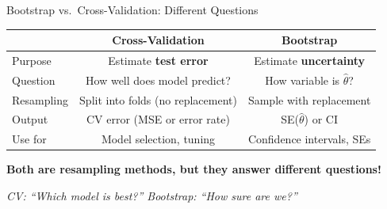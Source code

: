 \documentclass[aspectratio=169, 11pt]{beamer}
\begin{document}
\begin{frame}{Bootstrap vs.\ Cross-Validation: Different Questions}

\begin{center}
\begin{tabular}{lcc}
\toprule
 & Cross-Validation & Bootstrap \\
\midrule
Purpose & Estimate \textbf{test error} & Estimate \textbf{uncertainty} \\
Question & How well does model predict? & How variable is $\hat{\theta}$? \\
Resampling & Split into folds (no replacement) & Sample with replacement \\
Output & CV error (MSE or error rate) & SE($\hat{\theta}$) or CI \\
Use for & Model selection, tuning & Confidence intervals, SEs \\
\bottomrule
\end{tabular}
\end{center}

\vspace{0.5em}
\textbf{Both are resampling methods, but they answer different questions!}

\vspace{0.3em}
\textit{CV: ``Which model is best?'' \quad Bootstrap: ``How sure are we?''}
\end{frame}
\end{document}
